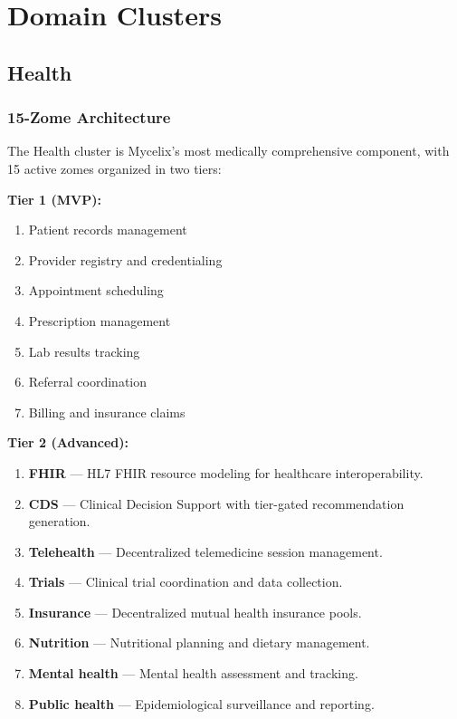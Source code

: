 \documentclass[12pt]{book}
\begin{document}
\part{Domain Clusters}

\chapter{Health}

\section{15-Zome Architecture}

The Health cluster is Mycelix's most medically comprehensive component, with 15
active zomes organized in two tiers:

\textbf{Tier 1 (MVP):}
\begin{enumerate}
  \item Patient records management
  \item Provider registry and credentialing
  \item Appointment scheduling
  \item Prescription management
  \item Lab results tracking
  \item Referral coordination
  \item Billing and insurance claims
\end{enumerate}

\textbf{Tier 2 (Advanced):}
\begin{enumerate}
  \item \textbf{FHIR} --- HL7 FHIR resource modeling for healthcare interoperability.
  \item \textbf{CDS} --- Clinical Decision Support with tier-gated
    recommendation generation.
  \item \textbf{Telehealth} --- Decentralized telemedicine session management.
  \item \textbf{Trials} --- Clinical trial coordination and data collection.
  \item \textbf{Insurance} --- Decentralized mutual health insurance pools.
  \item \textbf{Nutrition} --- Nutritional planning and dietary management.
  \item \textbf{Mental health} --- Mental health assessment and tracking.
  \item \textbf{Public health} --- Epidemiological surveillance and reporting.
\end{enumerate}
\end{document}
